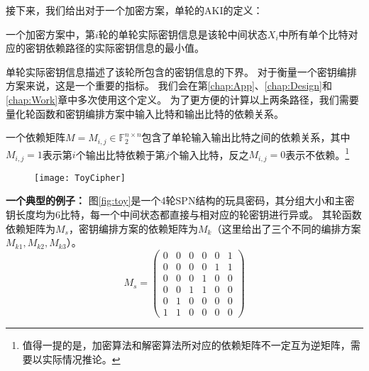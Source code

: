 接下来，我们给出对于一个加密方案，单轮的AKI的定义：
\begin{defn}[单轮实际密钥信息]
    一个加密方案中，第$i$轮的单轮实际密钥信息是该轮中间状态$X_i$中所有单个比特对应的密钥依赖路径的实际密钥信息的最小值。
    \label{def:RoundAKI}
\end{defn}
单轮实际密钥信息描述了该轮所包含的密钥信息的下界。
对于衡量一个密钥编排方案来说，这是一个重要的指标。
我们会在第\ref{chap:App}、\ref{chap:Design}和\ref{chap:Work}章中多次使用这个定义。
为了更方便的计算以上两条路径，我们需要量化轮函数和密钥编排方案中输入比特和输出比特的依赖关系。
\begin{defn}[依赖矩阵]
    一个依赖矩阵$M=M_{i,j}\in\mathbb{F}^{n\times n}_2$包含了单轮输入输出比特之间的依赖关系，其中$M_{i,j}=1$表示第$i$个输出比特依赖于第$j$个输入比特，反之$M_{i,j}=0$表示不依赖。\footnote{值得一提的是，加密算法和解密算法所对应的依赖矩阵不一定互为逆矩阵，需要以实际情况推论。}
\end{defn}
\begin{figure}[htbp]
\centering
    \texttt{[image: ToyCipher]}
\end{figure}
\textbf{一个典型的例子：}
图\ref{fig:toy}是一个4轮SPN结构的玩具密码，其分组大小和主密钥长度均为6比特，每一个中间状态都直接与相对应的轮密钥进行异或。
其轮函数依赖矩阵为$M_s$，密钥编排方案的依赖矩阵为$M_k$（这里给出了三个不同的编排方案$M_{k1},M_{k2},M_{k3}$）。
$$M_s=\left(
    \begin{array}{cccccc}
        0&0&0&0&0&1\\
        0&0&0&0&1&1\\
        0&0&0&1&0&0\\
        0&0&1&1&0&0\\
        0&1&0&0&0&0\\
        1&1&0&0&0&0
    \end{array}
\right)$$
